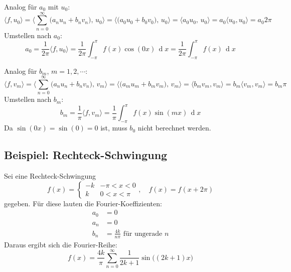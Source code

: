 \documentclass[a4paper, 11pt, accentcolor = tud3b]{tudreport}
\DeclareMathOperator{\total}{d}
\newcommand{\dif}[1]{\,\total#1}
\begin{document}
				Analog für \( a_0 \) mit \( u_0 \):
				\begin{equation*}
					\langle f, u_0 \rangle
						= \Bigg\langle \sum_{n = 0}^{\infty} \big( a_n u_n + b_n v_n \big),\, u_0 \Bigg\rangle
						= \Big\langle \big( a_0 u_0 + b_0 v_0 \big),\, u_0 \Big\rangle
						= \langle a_0 u_0,\, u_0 \rangle
						= a_0 \langle u_0, u_0 \rangle
						= a_0 2\pi
				\end{equation*}
				Umstellen nach \( a_0 \):
				\begin{equation*}
					a_0 = \frac{1}{2\pi} \langle f, u_0 \rangle = \frac{1}{2\pi} \int_{-\pi}^{\pi} \! f(x) \cos(0x) \dif{x} = \frac{1}{2\pi} \int_{-\pi}^{\pi} f(x) \dif{x}
				\end{equation*}
				
				Analog für \( b_m \), \( m = 1, 2, \cdots \):
				\begin{equation*}
					\langle f, v_m \rangle
						= \Bigg\langle \sum_{n = 0}^{\infty} \big( a_n u_n + b_n v_n \big),\, v_m \Bigg\rangle
						= \Big\langle \big( a_m u_m + b_m v_m \big),\, v_m \Big\rangle
						= \langle b_m v_m, v_m \rangle
						= b_m \langle v_m, v_m \rangle
						= b_m \pi
				\end{equation*}
				Umstellen nach \( b_m \):
				\begin{equation*}
					b_m = \frac{1}{\pi} \langle f, v_m \rangle = \frac{1}{\pi} \int_{-\pi}^{\pi} \! f(x) \sin(mx) \dif{x}
				\end{equation*}
				Da \( \sin(0x) = \sin(0) = 0 \) ist, muss \( b_0 \) nicht berechnet werden.

			\subsection{Beispiel: Rechteck-Schwingung}
				Sei eine Rechteck-Schwingung
				\begin{equation*}
					f(x) =
						\begin{cases}
							-k & -\pi < x < 0 \\
							k  & 0 < x < \pi
						\end{cases},\quad f(x) = f(x + 2\pi)
				\end{equation*}
				gegeben. Für diese lauten die Fourier-Koeffizienten:
				\begin{align*}
					a_0 &= 0 \\
					a_n &= 0 \\
					b_n &= \frac{4k}{n\pi} \text{ für ungerade } n
				\end{align*}
				Daraus ergibt sich die Fourier-Reihe:
				\begin{equation*}
					f(x) = \frac{4k}{\pi} \sum_{n = 0}^{\infty} \frac{1}{2k + 1} \sin\big((2k + 1) x\big)
				\end{equation*}
				
\end{document}
